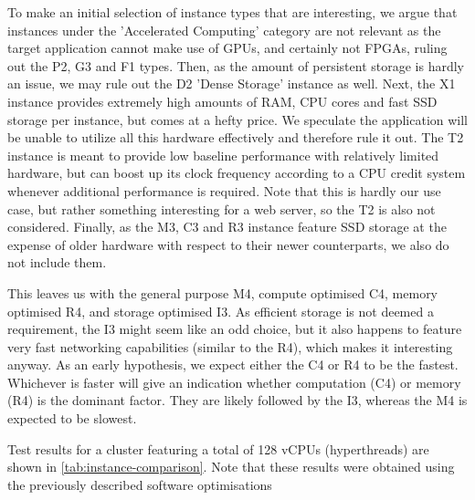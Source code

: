 \documentclass{article}
\begin{document}
To make an initial selection of instance types that are interesting, we argue that instances under the 'Accelerated Computing' category are not relevant as the target application cannot make use of GPUs, and certainly not FPGAs, ruling out the P2, G3 and F1 types.
Then, as the amount of persistent storage is hardly an issue, we may rule out the D2 'Dense Storage' instance as well.
Next, the X1 instance provides extremely high amounts of RAM, CPU cores and fast SSD storage per instance, but comes at a hefty price.
We speculate the application will be unable to utilize all this hardware effectively and therefore rule it out.
The T2 instance is meant to provide low baseline performance with relatively limited hardware, but can boost up its clock frequency according to a CPU credit system whenever additional performance is required.
Note that this is hardly our use case, but rather something interesting for a web server, so the T2 is also not considered.
Finally, as the M3, C3 and R3 instance feature SSD storage at the expense of older hardware with respect to their newer counterparts, we also do not include them.

This leaves us with the general purpose M4, compute optimised C4, memory optimised R4, and storage optimised I3.
As efficient storage is not deemed a requirement, the I3 might seem like an odd choice, but it also happens to feature very fast networking capabilities (similar to the R4), which makes it interesting anyway.
As an early hypothesis, we expect either the C4 or R4 to be the fastest.
Whichever is faster will give an indication whether computation (C4) or memory (R4) is the dominant factor.
They are likely followed by the I3, whereas the M4 is expected to be slowest.

Test results for a cluster featuring a total of 128 vCPUs (hyperthreads) are shown in \cref{tab:instance-comparison}. Note that these results were obtained using the previously described software optimisations
\end{document}
